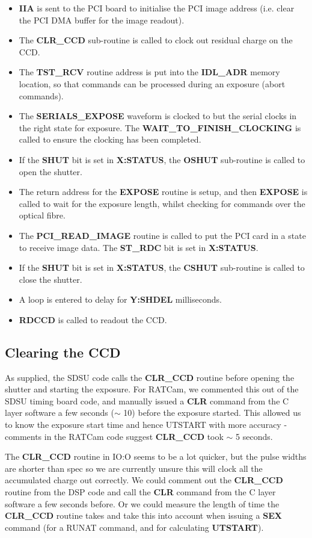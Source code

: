 \documentclass[10pt,a4paper]{article}
\begin{document}
\begin{itemize}
\item {\bf IIA} is sent to the PCI board to initialise the PCI image address 
      (i.e. clear the PCI DMA buffer for the image readout).
\item The {\bf CLR\_CCD} sub-routine is called to clock out residual charge on the CCD.
\item The {\bf TST\_RCV} routine address is put into the {\bf IDL\_ADR} memory location, so that commands can be
      processed during an exposure (abort commands).
\item The {\bf SERIALS\_EXPOSE} waveform is clocked to but the serial clocks in the right state for exposure. 
      The {\bf WAIT\_TO\_FINISH\_CLOCKING} is called to ensure the clocking has been completed.
\item If the {\bf SHUT} bit is set in {\bf X:STATUS}, the {\bf OSHUT} sub-routine is called to open the shutter.
\item The return address for the {\bf EXPOSE} routine is setup, and then {\bf EXPOSE} is called to wait for the
      exposure length, whilst checking for commands over the optical fibre.
\item The {\bf PCI\_READ\_IMAGE} routine is called to put the PCI card in a state to receive image data. The {\bf ST\_RDC} bit is set in {\bf X:STATUS}.
\item If the {\bf SHUT} bit is set in {\bf X:STATUS}, the {\bf CSHUT} sub-routine is called to close the shutter.
\item A loop is entered to delay for {\bf Y:SHDEL} milliseconds.
\item {\bf RDCCD} is called to readout the CCD.
\end{itemize}

\subsection{Clearing the CCD}

As supplied, the SDSU code calls the {\bf CLR\_CCD} routine before opening the shutter and starting the exposure.
For RATCam, we commented this out of the SDSU timing board code, and manually issued a {\bf CLR} command from the
C layer software a few seconds ($\sim$ 10) before the exposure started. This allowed us to know the exposure
start time and hence UTSTART with more accuracy - comments in the RATCam code suggest {\bf CLR\_CCD} took $\sim$ 5
seconds.

The {\bf CLR\_CCD} routine in IO:O seems to be a lot quicker, but the pulse widths are shorter than spec so we 
are currently unsure this will clock all the accumulated charge out correctly. We could comment out the 
{\bf CLR\_CCD} routine from the DSP code and call the {\bf CLR} command from the C layer software a few seconds before.
Or we could measure the length of time the {\bf CLR\_CCD} routine takes and take this into account when issuing
a {\bf SEX} command (for a RUNAT command, and for calculating {\bf UTSTART}).
\end{document}
